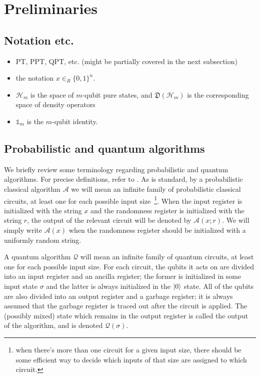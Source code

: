 \documentclass[11pt]{article}
\numberwithin{equation}{section}
\newcommand{\one}{\mathds 1}
\newcommand{\inrand}{\in_R}
\newcommand{\states}{\mathfrak D}
\begin{document}
\section{Preliminaries}

\subsection{Notation etc.}

\begin{itemize}
\item PT, PPT, QPT, etc. (might be partially covered in the next subsection)
\item the notation $x \inrand \{0,1\}^n$.
\item $\mathcal H_m$ is the space of $m$-qubit pure states, and $\states(\mathcal H_m)$ is the corresponding space of density operators
\item $\one_m$ is the $m$-qubit identity.
\end{itemize}

\subsection{Probabilistic and quantum algorithms}

We briefly review some terminology regarding probabilistic and quantum algorithms. For precise definitions, refer to \cite{ccreference}. As is standard, by a probabilistic classical algorithm $\mathcal A$ we will mean an infinite family of probabilistic classical circuits, at least one for each possible input size~\footnote{when there's more than one circuit for a given input size, there should be some efficient way to decide which inputs of that size are assigned to which circuit.}. When the input register is initialized with the string $x$ and the randomness register is initialized with the string $r$, the output of the relevant circuit will be denoted by $\mathcal A(x; r)$. We will simply write $\mathcal A(x)$ when the randomness register should be initialized with a uniformly random string.

A quantum algorithm $\mathcal Q$ will mean an infinite family of quantum circuits, at least one for each possible input size. For each circuit, the qubits it acts on are divided into an input register and an ancilla register; the former is initialized in some input state $\sigma$ and the latter is always initialized in the ${\left\vert{0}\right\rangle}$ state. All of the qubits are also divided into an output register and a garbage register; it is always assumed that the garbage register is traced out after the circuit is applied. The (possibly mixed) state which remains in the output register is called the output of the algorithm, and is denoted $\mathcal Q(\sigma)$.
\end{document}
